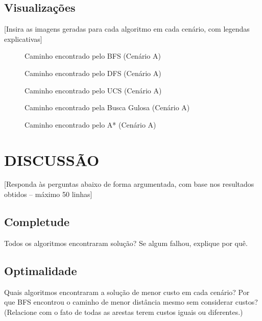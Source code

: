 \documentclass[12pt,a4paper]{article}
\begin{document}
\subsection{Visualizações}

[Insira as imagens geradas para cada algoritmo em cada cenário, com legendas explicativas]

\begin{figure}[H]
\centering
\caption{Caminho encontrado pelo BFS (Cenário A)}
\end{figure}

\begin{figure}[H]
\centering
\caption{Caminho encontrado pelo DFS (Cenário A)}
\end{figure}

\begin{figure}[H]
\centering
\caption{Caminho encontrado pelo UCS (Cenário A)}
\end{figure}

\begin{figure}[H]
\centering
\caption{Caminho encontrado pela Busca Gulosa (Cenário A)}
\end{figure}

\begin{figure}[H]
\centering
\caption{Caminho encontrado pelo A* (Cenário A)}
\end{figure}

\section{DISCUSSÃO}

[Responda às perguntas abaixo de forma argumentada, com base nos resultados obtidos – máximo 50 linhas]

\subsection{Completude}
Todos os algoritmos encontraram solução? Se algum falhou, explique por quê.

\subsection{Optimalidade}
Quais algoritmos encontraram a solução de menor custo em cada cenário? Por que BFS encontrou o caminho de menor distância mesmo sem considerar custos? (Relacione com o fato de todas as arestas terem custos iguais ou diferentes.)
\end{document}
